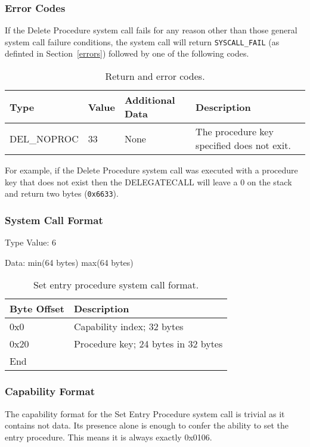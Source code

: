 \documentclass[english,a4paper]{article}
\let\oldparagraph\subsubsection
\renewcommand{\subsubsection}[1]{\oldparagraph{#1}\mbox{}}
\begin{document}
\subsubsection{Error Codes}
If the Delete Procedure system call fails for any reason other than those
general system call failure conditions, the system call will return
\texttt{SYSCALL\_FAIL} (as definted in Section~\ref{errors}) followed by one of
the following codes.

\begin{table}[H]
  \caption{Return and error codes.}
  \centering{}%
  \begin{tabular}{l|l|p{}|p{}}
    \hline
    Type & Value & Additional Data & Description\tabularnewline
    \hline
    \hline
    DEL\_NOPROC  & 33 & None & The procedure key specified does not exit.
      \tabularnewline
    \hline
  \end{tabular}
\end{table}

For example, if the Delete
Procedure system call was executed with a procedure key that does not exist then
the DELEGATECALL will leave a 0 on the stack and return two bytes
(\texttt{0x6633}).

\subsubsection{System Call Format}

Type Value: 6

Data: min(64 bytes) max(64 bytes)

\begin{table}[H]
  \caption{Set entry procedure system call format.}
  \centering{}%
  \begin{tabular}{l|p{}}
    \hline
    Byte Offset & Description\tabularnewline
    \hline
    \hline
    0x0 & Capability index; 32 bytes \tabularnewline
    0x20 & Procedure key; 24 bytes in 32 bytes \tabularnewline
    \hline
    End &  \tabularnewline
    \hline
  \end{tabular}
\end{table}

\subsubsection{Capability Format}
The capability format for the Set Entry Procedure system call is trivial as it
contains not data. Its presence alone is enough to confer the ability to set the
entry procedure. This means it is always exactly 0x0106.
\end{document}
